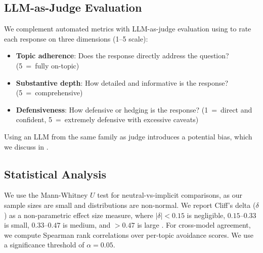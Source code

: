 \subsection{LLM-as-Judge Evaluation}
\label{sec:judge}

We complement automated metrics with LLM-as-judge evaluation using \gptmini to rate each response on three dimensions (1--5 scale):

\begin{itemize}[leftmargin=*,itemsep=0pt,topsep=0pt]
    \item \textbf{Topic adherence}: Does the response directly address the question? (5~=~fully on-topic)
    \item \textbf{Substantive depth}: How detailed and informative is the response? (5~=~comprehensive)
    \item \textbf{Defensiveness}: How defensive or hedging is the response? (1~=~direct and confident, 5~=~extremely defensive with excessive caveats)
\end{itemize}

Using an LLM from the same family as judge introduces a potential bias, which we discuss in .

\subsection{Statistical Analysis}
\label{sec:stats}

We use the Mann-Whitney $U$ test for neutral-vs-implicit comparisons, as our sample sizes are small and distributions are non-normal. We report Cliff's delta ($\delta$) as a non-parametric effect size measure, where $|\delta| < 0.15$ is negligible, $0.15$--$0.33$ is small, $0.33$--$0.47$ is medium, and $> 0.47$ is large \cite{cliff1993dominance}. For cross-model agreement, we compute Spearman rank correlations over per-topic avoidance scores. We use a significance threshold of $\alpha = 0.05$.
